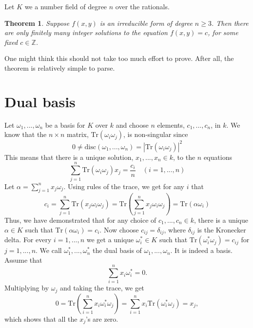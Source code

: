 \documentclass{article}
\newtheorem{theorem}{Theorem}[section]
\newcommand{\mbb}[1]{\mathbb{#1}}
\newcommand{\tr}[1]{\text{Tr}(#1)}
\begin{document}


Let $K$ we a number field of degree $n$ over the rationals.


\begin{theorem}
    Suppose $f(x,y)$ is an irreducible form of degree $n \geq 3$. Then there are only finitely many integer solutions to the equation $f(x,y) = c$, for some fixed $c \in \mbb{Z}$.
\end{theorem}
One might think this should not take too much effort to prove. After all, the theorem is relatively simple to parse.

\section*{Dual basis}
Let $\omega_1, ..., \omega_n$ be a basis for $K$ over $k$ and choose $n$ elements, $c_1, ..., c_n$, in $k$. We know that the $n \times n$ matrix, $\tr {\omega_i \omega_j}$, is non-singular since $$0 \neq \text{disc}(\omega_1, ..., \omega_n) = |\tr{\omega_i \omega_j}|^2$$
This means that there is a unique solution, $x_1, ..., x_n \in k$, to the $n$ equations
$$\sum_{j=1}^n \tr{\omega_i \omega_j} x_j = \frac{c_i}{n} \quad (i = 1, ..., n)$$
Let $\alpha = \sum_{j=1}^n x_j \omega_j$. Using rules of the trace, we get for any $i$ that
$$c_i = \sum_{j=1}^n \tr{x_j \omega_i \omega_j} = \tr{\sum_{j=1}^n x_j \omega_i \omega_j} = \tr{\alpha \omega_i}$$
Thus, we have demonstrated that for any choice of $c_1, ..., c_n \in k$, there is a unique $\alpha \in K$ such that $\tr{\alpha \omega_i} = c_i$. Now choose $c_{ij} = \delta_{ij}$, where $\delta_{ij}$ is the Kronecker delta. For every $i = 1, ..., n$ we get a unique $\omega_i^* \in K$ such that $\tr{\omega_i^* \omega_j} = c_{ij}$ for $j = 1, ..., n$. We call $\omega_1^*, ..., \omega_n^*$ the dual basis of $\omega_1, ..., \omega_n$. It is indeed a basis. Assume that 
$$\sum_{i=1}^n x_i \omega_i^* = 0.$$
Multiplying by $\omega_j$ and taking the trace, we get
$$0 = \tr{\sum_{i=1}^n x_i \omega_i^* \omega_j} = \sum_{i=1}^n x_i \tr{\omega_i^* \omega_j} = x_j,$$
which shows that all the $x_j$'s are zero.
\end{document}
